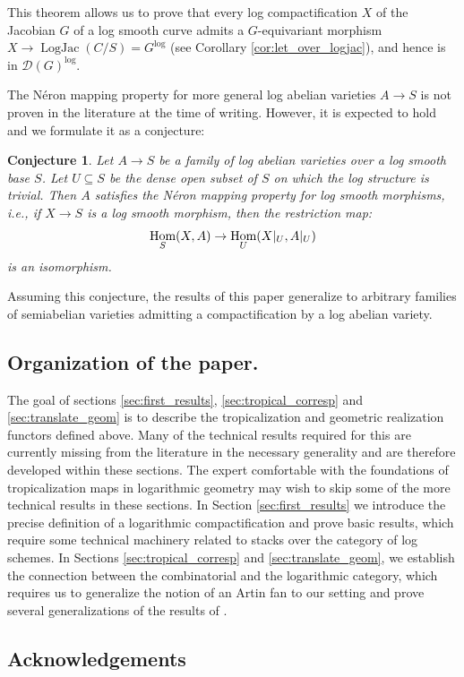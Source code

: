 \documentclass[11pt]{amsart}
\newtheorem{conjecture}{Conjecture}
\theoremstyle{definition}
\theoremstyle{remark}
\DeclareMathOperator{\LogJac}{LogJac}
\def\log{\mathrm{log}}
\DeclareMathOperator{\Hom}{\textup{Hom}}
\begin{document}
This theorem allows us to prove that every log compactification $X$ of the Jacobian $G$ of a log
smooth curve admits a $G$-equivariant morphism $X\to \LogJac(C/S)=G^{\log}$ (see Corollary \ref{cor:let_over_logjac}), and hence is in $\mathcal{D}(G)^{\log}$.

The Néron mapping property for more general log abelian varieties $A\to S$ is
not proven in the literature at the time of writing. However, it is expected to
hold and we formulate it as a conjecture:

\begin{conjecture}
	\label{conj:neron_mapping}
	Let $A\to S$ be a family of log abelian varieties over a log smooth base $S$. Let $U\subseteq S$ be the dense
	open subset of $S$ on which the log structure is trivial. Then $A$ satisfies the Néron mapping property for
	log smooth morphisms, i.e., if $X\to S$ is a log smooth morphism, then the restriction map:
	$$\Hom_S(X,A)\to \Hom_U(X|_U,A|_U)$$
	is an isomorphism.
\end{conjecture}

Assuming this conjecture, the results of this paper generalize to arbitrary families of semiabelian varieties
admitting a compactification by a log abelian variety.
\subsection{Organization of the paper.} The goal of sections \ref{sec:first_results}, \ref{sec:tropical_corresp} and \ref{sec:translate_geom} is to describe the tropicalization and geometric realization functors defined above. Many of the technical results required for this are currently missing from the literature in the necessary generality and are therefore developed within these sections. The expert comfortable with the foundations of tropicalization maps in logarithmic geometry may wish to skip some of the more technical results in these sections. In Section \ref{sec:first_results} we introduce the precise definition of a
logarithmic compactification and prove basic results, which require some
technical machinery related to stacks over the category of log schemes.
In Sections \ref{sec:tropical_corresp} and \ref{sec:translate_geom},
we establish the connection between the combinatorial and the logarithmic
category, which requires us to generalize the notion of an Artin fan
\cite{LogarithmicTauPandha2024} to our setting and prove several
generalizations of the results of \cite{SkeletonsAndFAbramo2015}.

\subsection*{Acknowledgements}
\end{document}
